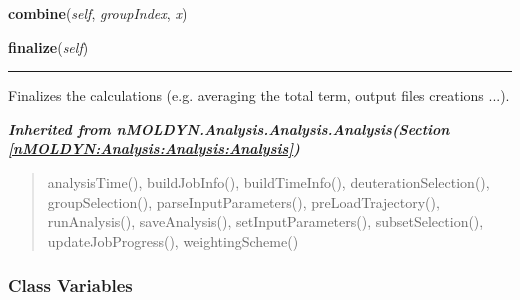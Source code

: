 \hspace{.8\funcindent}\begin{boxedminipage}{\funcwidth}

    \raggedright \textbf{combine}(\textit{self}, \textit{groupIndex}, \textit{x})

\setlength{\parskip}{2ex}
\setlength{\parskip}{1ex}
    \end{boxedminipage}

    \label{nMOLDYN:Analysis:Dynamics:RigidBodyTrajectory:finalize}

    \vspace{0.5ex}

\hspace{.8\funcindent}\begin{boxedminipage}{\funcwidth}

    \raggedright \textbf{finalize}(\textit{self})

    \vspace{-1.5ex}

    \rule{\textwidth}{0.5\fboxrule}
\setlength{\parskip}{2ex}
    Finalizes the calculations (e.g. averaging the total term, output files
    creations ...).

\setlength{\parskip}{1ex}
    \end{boxedminipage}


\large{\textbf{\textit{Inherited from nMOLDYN.Analysis.Analysis.Analysis\textit{(Section \ref{nMOLDYN:Analysis:Analysis:Analysis})}}}}

\begin{quote}
analysisTime(), buildJobInfo(), buildTimeInfo(), deuterationSelection(), groupSelection(), parseInputParameters(), preLoadTrajectory(), runAnalysis(), saveAnalysis(), setInputParameters(), subsetSelection(), updateJobProgress(), weightingScheme()
\end{quote}


  \subsubsection{Class Variables}

